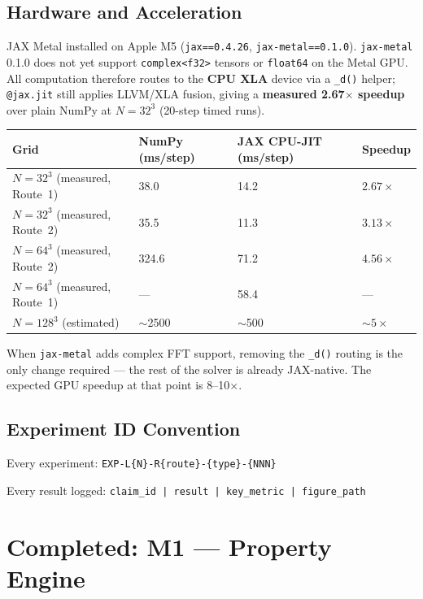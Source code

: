 \documentclass[11pt, a4paper]{article}
\theoremstyle{definition}
\theoremstyle{remark}
\begin{document}
\subsection{Hardware and Acceleration}

JAX Metal installed on Apple M5 (\texttt{jax==0.4.26}, \texttt{jax-metal==0.1.0}).
\texttt{jax-metal} 0.1.0 does not yet support \texttt{complex<f32>} tensors or \texttt{float64}
on the Metal GPU. All computation therefore routes to the \textbf{CPU XLA} device via a
\texttt{\_d()} helper; \texttt{@jax.jit} still applies LLVM/XLA fusion, giving a
\textbf{measured 2.67$\times$ speedup} over plain NumPy at $N=32^3$ (20-step timed runs).

\begin{center}
\begin{tabular}{llll}
\toprule
\textbf{Grid} & \textbf{NumPy (ms/step)} & \textbf{JAX CPU-JIT (ms/step)} & \textbf{Speedup} \\
\midrule
$N=32^3$ (measured, Route~1) & 38.0 & 14.2 & $\mathbf{2.67\times}$ \\
$N=32^3$ (measured, Route~2) & 35.5 & 11.3 & $\mathbf{3.13\times}$ \\
$N=64^3$ (measured, Route~2) & 324.6 & 71.2 & $\mathbf{4.56\times}$ \\
$N=64^3$ (measured, Route~1) & --- & 58.4 & --- \\
$N=128^3$ (estimated) & $\sim$2500 & $\sim$500 & $\sim5\times$ \\
\bottomrule
\end{tabular}
\end{center}

\noindent When \texttt{jax-metal} adds complex FFT support, removing the
\texttt{\_d()} routing is the only change required --- the rest of the solver is
already JAX-native. The expected GPU speedup at that point is 8--10$\times$.

\subsection{Experiment ID Convention}

Every experiment: \texttt{EXP-L\{N\}-R\{route\}-\{type\}-\{NNN\}}

Every result logged: \texttt{claim\_id | result | key\_metric | figure\_path}

\section{Completed: M1 --- Property Engine}
\end{document}
